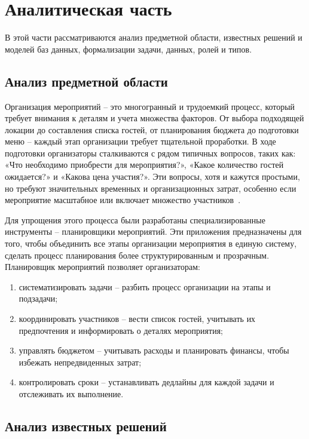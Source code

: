 \chapter{Аналитическая часть}

В этой части рассматриваются анализ предметной области, известных решений и моделей баз данных, формализации задачи, данных, ролей и типов.

\section{Анализ предметной области}

Организация мероприятий -- это многогранный и трудоемкий процесс, который требует внимания к деталям и учета множества факторов. От выбора подходящей локации до составления списка гостей, от планирования бюджета до подготовки меню -- каждый этап организации требует тщательной проработки. В ходе подготовки организаторы сталкиваются с рядом типичных вопросов, таких как: «Что необходимо приобрести для мероприятия?», «Какое количество гостей ожидается?» и «Какова цена участия?». Эти вопросы, хотя и кажутся простыми, но требуют значительных временных и организационных затрат, особенно если мероприятие масштабное или включает множество участников~\cite{lit1}.

Для упрощения этого процесса были разработаны специализированные инструменты -- планировщики мероприятий. Эти приложения предназначены для того, чтобы объединить все этапы организации мероприятия в единую систему, сделать процесс планирования более структурированным и прозрачным. Планировщик мероприятий позволяет организаторам:
\begin{enumerate}
	\item систематизировать задачи -- разбить процесс организации на этапы и подзадачи;
	\item координировать участников -- вести список гостей, учитывать их предпочтения и информировать о деталях мероприятия;
	\item управлять бюджетом -- учитывать расходы и планировать финансы, чтобы избежать непредвиденных затрат;
	\item контролировать сроки -- устанавливать дедлайны для каждой задачи и отслеживать их выполнение.
\end{enumerate}


\section{Анализ известных решений}

